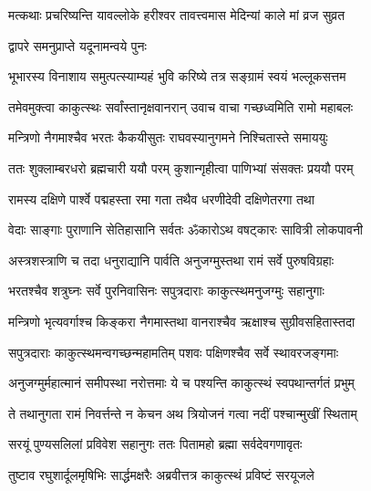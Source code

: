 
\twolineshloka
{मत्कथाः प्रचरिष्यन्ति यावल्लोके हरीश्वर}
{तावत्त्वमास मेदिन्यां काले मां व्रज सुव्रत}%



\onelineshloka
{द्वापरे समनुप्राप्ते यदूनामन्वये पुनः}%

\twolineshloka
{भूभारस्य विनाशाय समुत्पत्स्याम्यहं भुवि}
{करिष्ये तत्र सङ्ग्रामं स्वयं भल्लूकसत्तम}%


\twolineshloka
{तमेवमुक्त्वा काकुत्स्थः सर्वांस्तानृक्षवानरान्}
{उवाच वाचा गच्छध्वमिति रामो महाबलः}%

\twolineshloka
{मन्त्रिणो नैगमाश्चैव भरतः कैकयीसुतः}
{राघवस्यानुगमने निश्चितास्ते समाययुः}%

\twolineshloka
{ततः शुक्लाम्बरधरो ब्रह्मचारी ययौ परम्}
{कुशान्गृहीत्वा पाणिभ्यां संसक्तः प्रययौ परम्}%

\twolineshloka
{रामस्य दक्षिणे पार्श्वे पद्महस्ता रमा गता}
{तथैव धरणीदेवी दक्षिणेतरगा तथा}%

\twolineshloka
{वेदाः साङ्गाः पुराणानि सेतिहासानि सर्वतः}
{ॐकारोऽथ वषट्कारः सावित्री लोकपावनी}%

\twolineshloka
{अस्त्रशस्त्राणि च तदा धनुराद्यानि पार्वति}
{अनुजग्मुस्तथा रामं सर्वे पुरुषविग्रहाः}%

\twolineshloka
{भरतश्चैव शत्रुघ्नः सर्वे पुरनिवासिनः}
{सपुत्रदाराः काकुत्स्थमनुजग्मुः सहानुगाः}%

\twolineshloka
{मन्त्रिणो भृत्यवर्गाश्च किङ्करा नैगमास्तथा}
{वानराश्चैव ऋक्षाश्च सुग्रीवसहितास्तदा}%

\twolineshloka
{सपुत्रदाराः काकुत्स्थमन्वगच्छन्महामतिम्}
{पशवः पक्षिणश्चैव सर्वे स्थावरजङ्गमाः}%

\twolineshloka
{अनुजग्मुर्महात्मानं समीपस्था नरोत्तमाः}
{ये च पश्यन्ति काकुत्स्थं स्वपथान्तर्गतं प्रभुम्}%

\twolineshloka
{ते तथानुगता रामं निवर्त्तन्ते न केचन}
{अथ त्रियोजनं गत्वा नदीं पश्चान्मुखीं स्थिताम्}%

\twolineshloka
{सरयूं पुण्यसलिलां प्रविवेश सहानुगः}
{ततः पितामहो ब्रह्मा सर्वदेवगणावृतः}%

\twolineshloka
{तुष्टाव रघुशार्दूलमृषिभिः सार्द्धमक्षरैः}
{अब्रवीत्तत्र काकुत्स्थं प्रविष्टं सरयूजले}%


